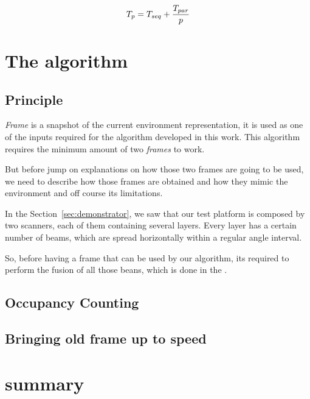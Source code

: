 \begin{equation}
\label{eq:amidahls}
T_p=T_{seq}+{T_{par} \over p}
\end{equation}

\section{The algorithm}

\subsection{Principle} 

\textit{Frame} is a snapshot of the current environment representation, it is used as one of the inputs required for the algorithm developed in this work. This algorithm requires the minimum amount of two \textit{frames} to work. 

But before jump on explanations on how those two frames are going to be used, we need to describe how those frames are obtained and how they mimic the environment and off course its limitations.

In the Section~\ref{sec:demonstrator}, we saw that our test platform is composed by two scanners, each of them containing several layers. Every layer has a certain number of beams, which are spread horizontally within a regular angle interval. 

So, before having a frame that can be used by our algorithm, its required to perform the fusion of all those beans, which is done in the \textit{}. 

\subsection{Occupancy Counting} 

\subsection{Bringing old frame up to speed}


\section{summary}


